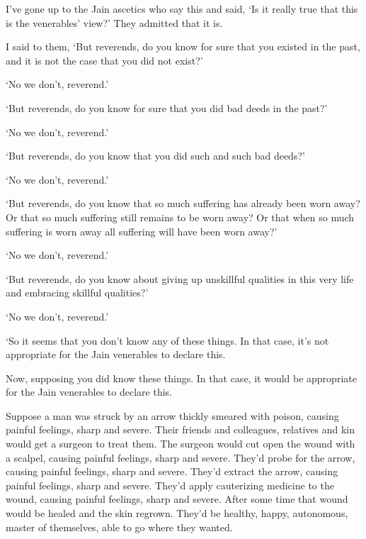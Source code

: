 \documentclass[12pt,openany]{book}%
\begin{document}
I’ve gone up to the Jain ascetics who say this and said, ‘Is it really true that this is the venerables’ view?’ They admitted that it is. 

I said to them, ‘But reverends, do you know for sure that you existed in the past, and it is not the case that you did not exist?’ 

‘No we don’t, reverend.’ 

‘But reverends, do you know for sure that you did bad deeds in the past?’ 

‘No we don’t, reverend.’ 

‘But reverends, do you know that you did such and such bad deeds?’ 

‘No we don’t, reverend.’ 

‘But reverends, do you know that so much suffering has already been worn away? Or that so much suffering still remains to be worn away? Or that when so much suffering is worn away all suffering will have been worn away?’ 

‘No we don’t, reverend.’ 

‘But reverends, do you know about giving up unskillful qualities in this very life and embracing skillful qualities?’ 

‘No we don’t, reverend.’ 

‘So it seems that you don’t know any of these things. In that case, it’s not appropriate for the Jain venerables to declare this. 

Now, supposing you did know these things. In that case, it would be appropriate for the Jain venerables to declare this. 

Suppose a man was struck by an arrow thickly smeared with poison, causing painful feelings, sharp and severe. Their friends and colleagues, relatives and kin would get a surgeon to treat them. The surgeon would cut open the wound with a scalpel, causing painful feelings, sharp and severe. They’d probe for the arrow, causing painful feelings, sharp and severe. They’d extract the arrow, causing painful feelings, sharp and severe. They’d apply cauterizing medicine to the wound, causing painful feelings, sharp and severe. After some time that wound would be healed and the skin regrown. They’d be healthy, happy, autonomous, master of themselves, able to go where they wanted. 
\end{document}
